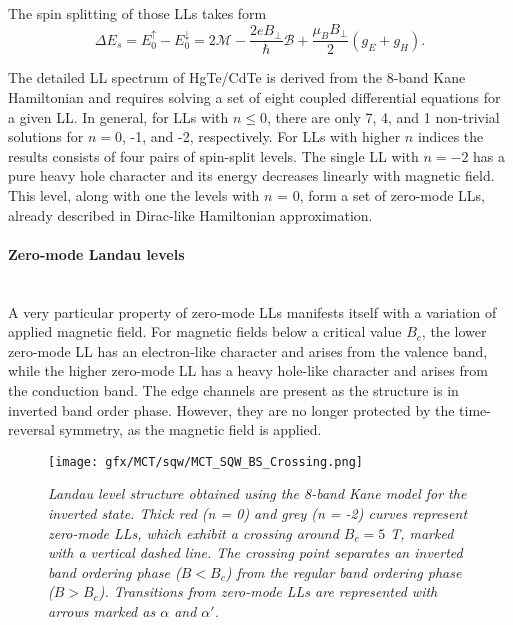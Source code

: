 \documentclass[titlepage,a4paper]{book}
\newcommand{\wciecie}{\quad\phantom{v}}
\newcommand{\myparagraph}[1]{\paragraph{#1}\mbox{}\\}
\begin{document}
The spin splitting of those LLs takes form
\begin{equation}
\label{eq:MCT_SQW_ZeroMode_SpinSplitting}
\Delta E_s = E^{\uparrow}_0 - E^{\downarrow}_0 = 2\mathcal{M} -\frac{2eB_{\perp}}{\hbar}\mathcal{B}+\frac{\mu_B B_{\perp}}{2}(g_E + g_H). 
\end{equation}

The detailed LL spectrum of HgTe/CdTe is derived from the 8-band Kane Hamiltonian and requires solving a set of eight coupled differential equations for a given LL. In general, for LLs with $n \leq 0$, there are only 7, 4, and 1 non-trivial solutions for $n = 0$, -1, and -2, respectively. For LLs with higher $n$ indices the results consists of four pairs of spin-split levels. The single LL with $n = -2$ has a pure heavy hole character and its energy decreases linearly with magnetic field. This level, along with one the levels with $n$ = 0, form a set of zero-mode LLs, already described in Dirac-like Hamiltonian approximation.

\myparagraph{Zero-mode Landau levels}
\wciecie
A very particular property of zero-mode LLs manifests itself with a variation of applied magnetic field. For magnetic fields below a critical value $B_c$, the lower zero-mode LL has an electron-like character and arises from the valence band, while the higher zero-mode LL has a heavy hole-like character and arises from the conduction band. The edge channels are present as the structure is in inverted band order phase. However, they are no longer protected by the time-reversal symmetry, as the magnetic field is applied. 

\begin{figure}[ht]
	\centering
	\texttt{[image: gfx/MCT/sqw/MCT\_SQW\_BS\_Crossing.png]}
	\vspace{-10pt}
	\caption{\textit{Landau level structure obtained using the 8-band Kane model for the inverted state. Thick red (n = 0) and grey (n = -2) curves represent zero-mode LLs, which exhibit a crossing around $B_c = 5$ T, marked with a vertical dashed line. The crossing point separates an inverted band ordering phase ($B < B_c$) from the regular band ordering phase ($B > B_c$). Transitions from zero-mode LLs are represented with arrows marked as $\alpha$ and $\alpha'$.}}
	\label{fig:MCT_SQW_BS_Crossing}
\end{figure} 
\end{document}
